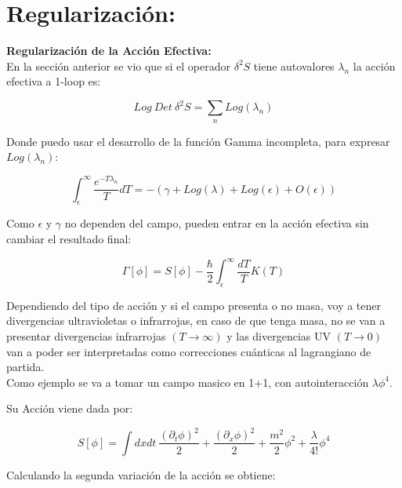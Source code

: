 \section{Regularización:}

\textbf{Regularización de la Acción Efectiva:} \\

En la sección anterior se vio que si el operador $\delta ^2 S$ tiene autovalores $\lambda _n$ la acción efectiva a 1-loop es:

\begin{equation}
Log \ Det \ \delta ^2 S = 
\sum _n Log( \lambda _n )
\end{equation}

Donde puedo usar el desarrollo de la función Gamma incompleta, para expresar $Log ( \lambda _n )$:

\begin{equation}
\int _ { \epsilon } ^{\infty} \frac{e ^{- T \lambda _n}}{T} dT =
- \left(
		\gamma + Log ( \lambda ) + Log( \epsilon )  + O ( \epsilon  ) 
		\right)
\end{equation}

Como  $ \epsilon $ y $ \gamma $ no dependen del campo, pueden entrar en la acción efectiva sin cambiar el resultado final:

\begin{equation}
\Gamma [ \phi ] = 
S[ \phi ] - 
\frac{\hbar }{2}
\int _ { \epsilon } ^{\infty} \frac{ dT}{T} K(T)
\end{equation}

Dependiendo del tipo de acción y si el campo presenta o no masa, voy a tener divergencias ultravioletas o infrarrojas, en caso de que tenga masa, no se van a presentar divergencias infrarrojas $(T \rightarrow \infty)$ y las divergencias UV $(T \rightarrow 0)$ van a poder ser interpretadas como correcciones cuánticas al lagrangiano de partida. \\


Como ejemplo se va a tomar un campo masico en 1+1, con autointeracción $\lambda \phi ^4 $.

Su Acción viene dada por:

\begin{equation}
S[ \phi ] = \int dx dt \ 
\frac{( \partial _t \phi ) ^2}{2} +  
\frac{( \partial _x \phi ) ^2}{2} +
\frac{m ^2 }{2} \phi ^2 +
\frac{\lambda}{4!} \phi ^4 
\end{equation}

Calculando la segunda variación de la acción se obtiene:

